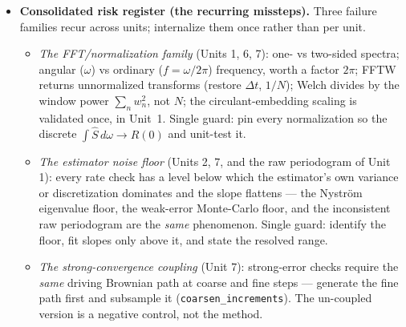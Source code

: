 \documentclass[11pt]{article}
\begin{document}
\begin{itemize}[leftmargin=1.4cm]
  \begin{itemize}[leftmargin=1.0cm]
    \item \emph{Stochastic slopes} (Monte Carlo covariance error vs.\ $N^{-1/2}$; Euler--Maruyama strong $0.5$ / weak $1.0$ on GBM; ergodic variance vs.\ $1/T$; the KS-statistic vs.\ $n^{-1/2}$ or $n^{-1}$ of Unit~5): fit the slope on a log--log scale and gate on agreement with the theoretical value to within a small multiple ($2$--$3\times$) of the fitted slope's own standard error --- the estimator variance differs sharply between checks, so a single fixed absolute tolerance would be simultaneously too loose in one place and too tight in another.
    \item \emph{The deterministic KL eigenvalue-decay slope}: here the regression residuals are model misspecification (the asymptotic $k^{-2}$ plus the discretization noise floor), \emph{not} sampling noise, so a regression standard error is not a sampling standard error and the SE-based gate is not statistically meaningful. Fit only within the resolved window (above the noise floor) and gate the fitted exponent against the theoretical $-2$ with a fixed absolute margin.
  \end{itemize}
  \item \textbf{Consolidated risk register (the recurring missteps).} Three failure families recur across units; internalize them once rather than per unit.
  \begin{itemize}[leftmargin=1.0cm]
    \item \emph{The FFT/normalization family} (Units 1, 6, 7): one- vs two-sided spectra; angular ($\omega$) vs ordinary ($f=\omega/2\pi$) frequency, worth a factor $2\pi$; FFTW returns unnormalized transforms (restore $\Delta t$, $1/N$); Welch divides by the window power $\sum_n w_n^2$, not $N$; the circulant-embedding scaling is validated once, in Unit~1. Single guard: pin every normalization so the discrete $\int\widehat S\,d\omega\to R(0)$ and unit-test it.
    \item \emph{The estimator noise floor} (Units 2, 7, and the raw periodogram of Unit 1): every rate check has a level below which the estimator's own variance or discretization dominates and the slope flattens --- the Nystr\"om eigenvalue floor, the weak-error Monte-Carlo floor, and the inconsistent raw periodogram are the \emph{same} phenomenon. Single guard: identify the floor, fit slopes only above it, and state the resolved range.
    \item \emph{The strong-convergence coupling} (Unit 7): strong-error checks require the \emph{same} driving Brownian path at coarse and fine steps --- generate the fine path first and subsample it (\texttt{coarsen\_increments}). The un-coupled version is a negative control, not the method.

\end{itemize}
\end{itemize}
\end{document}
